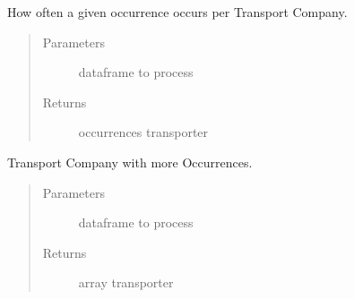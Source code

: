 \documentclass[letterpaper,10pt,english]{sphinxmanual}
\begin{document}
\begin{fulllineitems}
\label{\detokenize{algorithms:algorithms.idp.idp.get_df_frequency_occurrences_transporter}}
\sphinxAtStartPar
How often a given occurrence occurs per Transport Company.
\begin{quote}\begin{description}
\item[{Parameters}] \leavevmode
\sphinxAtStartPar
{} \textendash{} dataframe to process

\item[{Returns}] \leavevmode
\sphinxAtStartPar
occurrences transporter

\end{description}\end{quote}

\end{fulllineitems}


\begin{fulllineitems}
\label{\detokenize{algorithms:algorithms.idp.idp.get_df_occurrences_day_transporter}}
\sphinxAtStartPar
Transport Company with more Occurrences.
\begin{quote}\begin{description}
\item[{Parameters}] \leavevmode
\sphinxAtStartPar
{} \textendash{} dataframe to process

\item[{Returns}] \leavevmode
\sphinxAtStartPar
array transporter

\end{description}\end{quote}

\end{fulllineitems}

\end{document}

